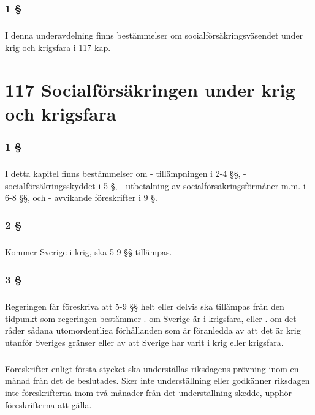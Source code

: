 \documentclass[a4paper,notitlepage,openany,10pt]{book}
\begin{document}
\subsection*{1 §}
\paragraph*{}
I denna underavdelning finns bestämmelser om socialförsäkringsväsendet under krig och krigsfara i 117 kap.
\chapter*{117 Socialförsäkringen under krig och krigsfara}
\subsection*{1 §}
\paragraph*{}
I detta kapitel finns bestämmelser om
\newline - tillämpningen i 2-4 §§,
\newline - socialförsäkringsskyddet i 5 §,
\newline - utbetalning av socialförsäkringsförmåner m.m. i 6-8 §§, och
\newline - avvikande föreskrifter i 9 §.
\subsection*{2 §}
\paragraph*{}
Kommer Sverige i krig, ska 5-9 §§ tillämpas.
\subsection*{3 §}
\paragraph*{}
Regeringen får föreskriva att 5-9 §§ helt eller delvis ska tillämpas från den tidpunkt som regeringen bestämmer
. om Sverige är i krigsfara, eller
. om det råder sådana utomordentliga förhållanden som är föranledda av att det är krig utanför Sveriges gränser eller av att Sverige har varit i krig eller krigsfara.
\paragraph*{}
Föreskrifter enligt första stycket ska underställas riksdagens prövning inom en månad från det de beslutades.
Sker inte underställning eller godkänner riksdagen inte föreskrifterna inom två månader från det underställning skedde, upphör föreskrifterna att gälla.
\end{document}
